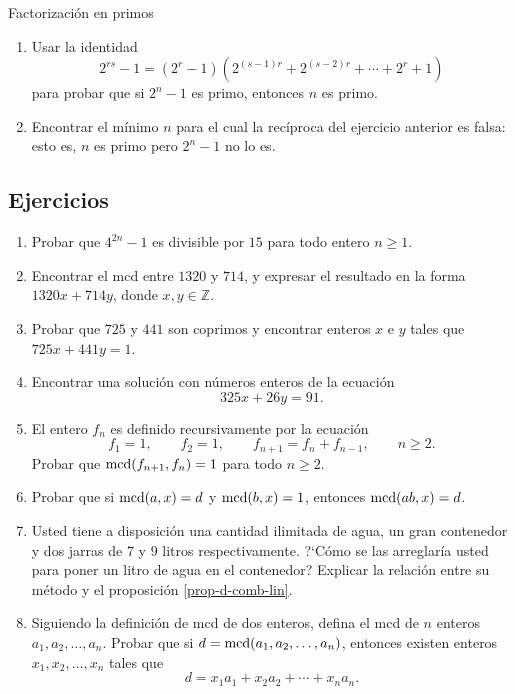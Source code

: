 \begin{section}{Factorización en primos}
\begin{enumerate}[1)]
\item Usar la identidad
$$
2^{rs} -1 = (2^r-1) (2^{(s-1)r}+2^{(s-2)r}+\cdots +2^r+1)
$$
para probar que si $2^n-1$ es primo, entonces $n$ es primo.

\item Encontrar el mínimo $n$ para el cual la recíproca del ejercicio anterior
es falsa: esto es, $n$ es primo pero $2^n-1$ no lo es.
\end{enumerate}
	
	
\section{Ejercicios}	
\begin{enumerate}[1)]
\item Probar que $4^{2n}-1$ es divisible por $15$ para todo entero $n\ge
1$.
\item Encontrar el mcd entre $1320$ y $714$, y expresar el resultado en la
forma $1320x+714y$, don\-de $x,y \in \mathbb Z$.
\item Probar que $725$ y $441$ son coprimos y encontrar enteros $x$ e $y$
tales que $725x+441y=1$.
\item Encontrar una solución con números enteros de la ecuación
$$ 325x+26y=91.$$
\item El entero $f_n$ es definido recursivamente por la ecuación
$$
f_1=1,\qquad f_2=1, \qquad f_{n+1} = f_n + f_{n-1}, \qquad
\text{$n\ge 2$}.
$$
Probar que $\operatorname{mcd}(f_{n+1},f_n)=1$ para todo $n\ge2$.

\item Probar que si $\operatorname{mcd}(a,x)=d$ y $\operatorname{mcd}(b,x)=1$, entonces $\operatorname{mcd}(ab,x)=d$.

\item Usted tiene a disposición una cantidad ilimitada de agua, un gran
contenedor y dos jarras de $7$ y $9$ litros respectivamente. ?`Cómo se
las arreglaría usted para poner un litro de agua en el contenedor?
Explicar la relación entre su método y el proposición \ref{prop-d-comb-lin}.

\item Siguiendo la definición de mcd de dos enteros, defina el mcd de
$n$ enteros $a_1,a_2,\ldots,a_n$. Probar que si
$d=\operatorname{mcd}(a_1,a_2,\ldots,a_n)$, entonces existen enteros
$x_1,x_2,\ldots,x_n$ tales que
$$
d=x_1a_1+x_2a_2+\cdots+x_na_n.
$$


\end{enumerate}
\end{section}
